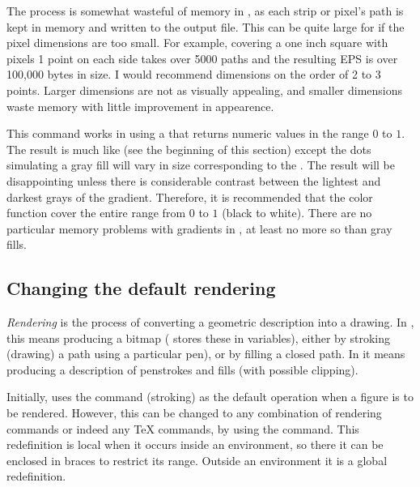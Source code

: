 \documentclass[letterpaper]{article}
\begin{document}
The process is somewhat wasteful of memory in \MP{}, as each strip or
pixel's path is kept in memory and written to the output file. This can
be quite large for  if the pixel dimensions are too
small. For example, covering a one inch square with pixels 1 point on
each side takes over 5000 paths and the resulting EPS is over 100,000
bytes in size. I would recommend dimensions on the order of 2 to 3
points. Larger dimensions are not as visually appealing, and smaller
dimensions waste memory with little improvement in appearence.

This command works in \MF{} using a  that returns numeric
values in the range $0$ to $1$. The result is much like
 (see the beginning of this section) except
the dots simulating a gray fill will vary in size corresponding to the
. The result will be disappointing unless there is
considerable contrast between the lightest and darkest grays of the
gradient. Therefore, it is recommended that the color function cover the
entire range from $0$ to $1$ (black to white). There are no particular
memory problems with gradients in \MF{}, at least no more so than gray
fills.


\subsection{Changing the default rendering}\label{default}

\emph{Rendering} is the process of converting a geometric description
into a drawing.  In \MF{}, this means producing a bitmap (\MF{} stores
these in  variables), either by stroking (drawing) a path
using a particular pen), or by filling a closed path. In \MP{} it means
producing a \PS{} description of penstrokes and fills (with possible
clipping).

\begin{cd}
%
\end{cd}

Initially, \mfp{} uses the  command (stroking) as the default
operation when a figure is to be rendered.  However, this can be changed
to any combination of \mfp{} rendering commands or indeed any \TeX{}
commands, by using the  command.  This redefinition is
local when it occurs inside an  environment, so there it can
be enclosed in braces to restrict its range. Outside an 
environment it is a global redefinition.
\end{document}
